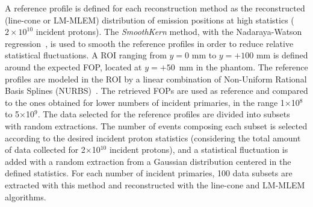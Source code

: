 A reference profile is defined for each reconstruction method as the reconstructed (line-cone or LM-MLEM) distribution of emission positions at high statistics ($\mathrm{2\times10^{10}}$ incident protons). The \textit{SmoothKern} method, with the Nadaraya-Watson regression~\cite{Nadaraya_regression, Watson_regression}, is used to smooth the reference profiles in order to reduce relative statistical fluctuations. A ROI ranging from $y=0$ mm to $y=+100$ mm is defined around the expected FOP, located at $y=+50$~mm in the phantom. The reference profiles are modeled in the ROI by a linear combination of Non-Uniform Rational Basis Splines (NURBS)~\cite{NURBS}. The retrieved FOPs are used as reference and compared to the ones obtained for lower numbers of incident primaries, in the range 1$\times$10$^8$ to 5$\times$10$^9$. 
The data selected for the reference profiles are divided into subsets with random extractions. The number of events composing each subset is selected according to the desired incident proton statistics (considering the total amount of data collected for 2$\times$10$^{10}$ incident protons), and a statistical fluctuation is added with a random extraction from a Gaussian distribution centered in the defined statistics. For each number of incident primaries, 100 data subsets are extracted with this method and reconstructed with the line-cone and LM-MLEM algorithms.
